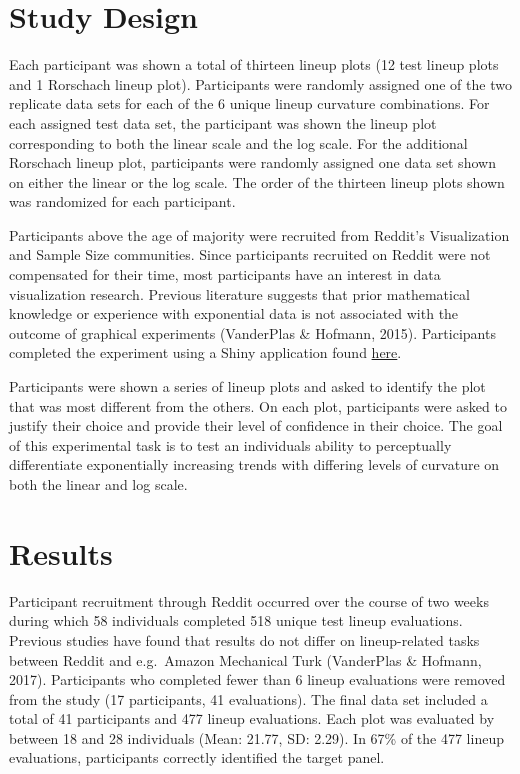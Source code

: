 \documentclass[print]{nuthesis}
\begin{document}
\hypertarget{study-design}{%
\section{Study Design}\label{study-design}}

Each participant was shown a total of thirteen lineup plots (12 test lineup plots and 1 Rorschach lineup plot). Participants were randomly assigned one of the two replicate data sets for each of the 6 unique lineup curvature combinations.
For each assigned test data set, the participant was shown the lineup plot corresponding to both the linear scale and the log scale. For the additional Rorschach lineup plot, participants were randomly assigned one data set shown on either the linear or the log scale.
The order of the thirteen lineup plots shown was randomized for each participant.

Participants above the age of majority were recruited from Reddit's Visualization and Sample Size communities.
Since participants recruited on Reddit were not compensated for their time, most participants have an interest in data visualization research.
Previous literature suggests that prior mathematical knowledge or experience with exponential data is not associated with the outcome of graphical experiments (VanderPlas \& Hofmann, 2015).
Participants completed the experiment using a Shiny application found \href{https://shiny.srvanderplas.com/log-study/}{here}.

Participants were shown a series of lineup plots and asked to identify the plot that was most different from the others.
On each plot, participants were asked to justify their choice and provide their level of confidence in their choice.
The goal of this experimental task is to test an individuals ability to perceptually differentiate exponentially increasing trends with differing levels of curvature on both the linear and log scale.

\hypertarget{results}{%
\section{Results}\label{results}}

Participant recruitment through Reddit occurred over the course of two weeks during which 58 individuals completed 518 unique test lineup evaluations.
Previous studies have found that results do not differ on lineup-related tasks between Reddit and e.g.~Amazon Mechanical Turk (VanderPlas \& Hofmann, 2017).
Participants who completed fewer than 6 lineup evaluations were removed from the study (17 participants, 41 evaluations).
The final data set included a total of 41 participants and 477 lineup evaluations.
Each plot was evaluated by between 18 and 28 individuals (Mean: 21.77, SD: 2.29).
In 67\% of the 477 lineup evaluations, participants correctly identified the target panel.
\end{document}
